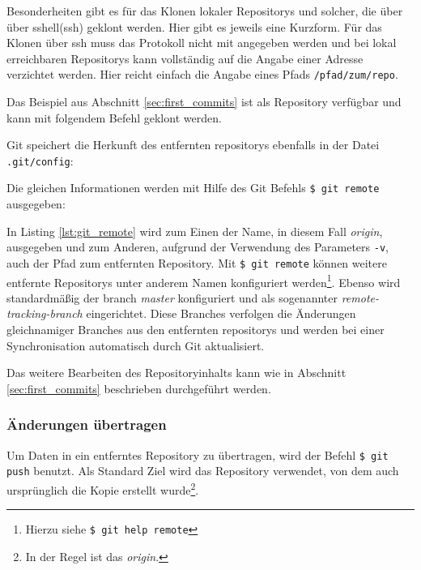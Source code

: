 
Besonderheiten gibt es für das Klonen lokaler Repositorys und solcher, die über
über \gls{sshell}(\acrshort{ssh}) geklont werden. Hier gibt es jeweils eine
Kurzform. Für das Klonen über \acrshort{ssh} muss das Protokoll nicht mit
angegeben werden und bei lokal erreichbaren Repositorys kann vollständig auf
die Angabe einer Adresse verzichtet werden. Hier reicht einfach die Angabe
eines Pfads \texttt{/pfad/zum/repo}.

Das Beispiel aus Abschnitt \ref{sec:first_commits} ist als
Repository verfügbar und kann mit folgendem Befehl geklont werden.


Git speichert die Herkunft des entfernten \glspl{repository} ebenfalls in der
Datei \texttt{.git/config}:


Die gleichen Informationen werden mit Hilfe des Git Befehls \texttt{\$ git
remote} ausgegeben:


In Listing \ref{lst:git_remote} wird zum Einen der Name, in diesem Fall
\textit{origin}, ausgegeben und zum Anderen, aufgrund der Verwendung des
Parameters \texttt{-v}, auch der Pfad zum entfernten Repository. Mit \texttt{\$
git remote} können weitere entfernte Repositorys unter anderem Namen
konfiguriert werden\footnote{Hierzu siehe \texttt{\$ git help remote}}. Ebenso
wird standardmäßig der \gls{branch} \textit{master} konfiguriert und als
sogenannter \textit{remote-tracking-branch} eingerichtet. Diese Branches verfolgen
die Änderungen gleichnamiger Branches aus den entfernten \glspl{repository}
und werden bei einer Synchronisation automatisch durch Git
aktualisiert. \cite[S.~141-143]{gitosp}

Das weitere Bearbeiten des Repositoryinhalts kann wie in Abschnitt
\ref{sec:first_commits} beschrieben durchgeführt werden.

\subsubsection{Änderungen übertragen}\label{sec:pushchanges}
Um Daten in ein entferntes Repository zu übertragen, wird der Befehl \texttt{\$
git push} benutzt. Als Standard Ziel wird das Repository verwendet, von dem auch
ursprünglich die Kopie erstellt wurde\footnote{In der Regel ist das \textit{origin}.}.

